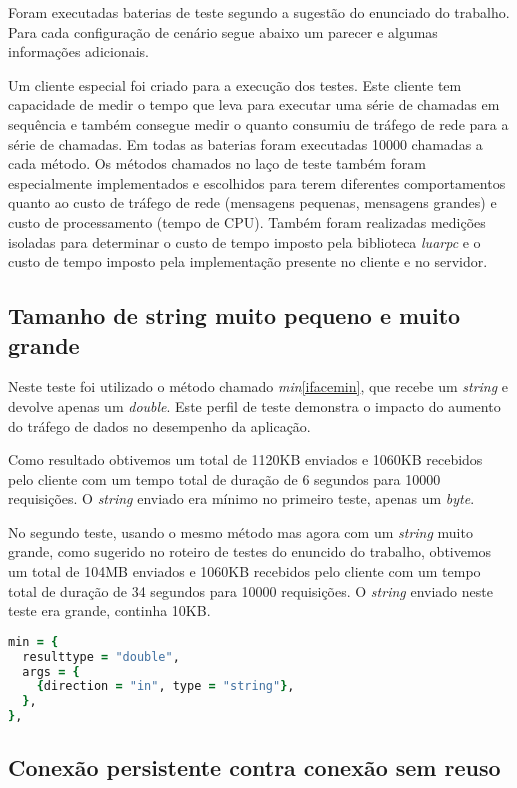 \documentclass[11pt]{article}
\begin{document}
Foram executadas baterias de teste segundo a sugestão do enunciado do trabalho.
Para cada configuração de cenário segue abaixo um parecer e algumas informações
adicionais.

Um cliente especial foi criado para a execução dos testes. Este cliente tem
capacidade de medir o tempo que leva para executar uma série de chamadas em
sequência e também consegue medir o quanto consumiu de tráfego de rede para a
série de chamadas. Em todas as baterias foram executadas 10000 chamadas a cada
método. Os métodos chamados no laço de teste também foram especialmente
implementados e escolhidos para terem diferentes comportamentos quanto ao custo
de tráfego de rede (mensagens pequenas, mensagens grandes) e custo de
processamento (tempo de CPU). Também foram realizadas medições isoladas para
determinar o custo de tempo imposto pela biblioteca \textit{luarpc} e o custo de
tempo imposto pela implementação presente no cliente e no servidor.

\subsection{Tamanho de string muito pequeno e muito grande}\label{subsec:stringsize}

Neste teste foi utilizado o método chamado \textit{min}\ref{ifacemin}, que
recebe um \textit{string} e devolve apenas um \textit{double}. Este perfil de
teste demonstra o impacto do aumento do tráfego de dados no desempenho da
aplicação.

Como resultado obtivemos um total de 1120KB enviados e 1060KB recebidos pelo
cliente com um tempo total de duração de 6 segundos para 10000 requisições. O
\textit{string} enviado era mínimo no primeiro teste, apenas um \textit{byte}.

No segundo teste, usando o mesmo método mas agora com um \textit{string} muito
grande, como sugerido no roteiro de testes do enuncido do trabalho, obtivemos um
total de 104MB enviados e 1060KB recebidos pelo cliente com um tempo total de
duração de 34 segundos para 10000 requisições. O \textit{string} enviado neste
teste era grande, continha 10KB.

\begin{lstlisting}[label={ifacemin},language=Ruby,caption=Interface min]
min = {
  resulttype = "double",
  args = {
    {direction = "in", type = "string"},
  },
},
\end{lstlisting}

\subsection{Conexão persistente contra conexão sem reuso}\label{subsec:persist}
\end{document}
